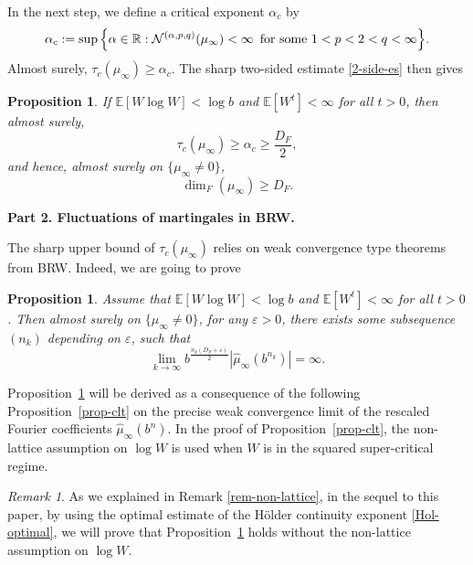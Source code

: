 \documentclass[12pt]{amsart}
\newtheorem{proposition}[theorem]{Proposition}
\theoremstyle{definition}
\theoremstyle{remark}
\newtheorem*{remark*}{Remark}
\newcommand{\R}{\mathbb{R}}
\newcommand{\E}{\mathbb{E}}
\numberwithin{equation}{section}
\begin{document}
In the next step, we define a critical exponent $\alpha_c$ by 
\begin{align}\label{def-a-c}
\alpha_c: =  \sup \Big\{\alpha \in \R:  \mathcal{N}^{(\alpha, p, q)}(\mu_\infty) <\infty \text{\, for some $1<p<2<q<\infty$} \Big\}. 
\end{align}
Almost surely, $\tau_c(\mu_\infty) \ge \alpha_c$. The sharp two-sided estimate \eqref{2-side-es} then  gives

\begin{proposition}\label{prop-a-c}
If $\E[W\log W]<\log b$ and $\E[W^t]<\infty$ for all $t>0$,   then  almost surely, 
\[
\tau_c(\mu_\infty) \ge \alpha_c \ge \frac{D_F}{2}, 
\]
and hence, almost surely on $\{\mu_\infty \ne 0\}$, 
\[
\dim_F(\mu_\infty) \ge D_F.
\]
\end{proposition}


{\flushleft \bf  Part 2. Fluctuations of martingales in BRW.} 


The sharp upper bound of $\tau_c(\mu_\infty)$ relies on weak convergence type theorems from BRW. Indeed, we  are going to prove

\begin{proposition}\label{prop-to-infty}
Assume that $\E[W\log W]<\log b$ and $\E[W^t]<\infty$ for all $t>0$.   Then  almost surely on $\{\mu_\infty\ne 0\}$,   for any $\varepsilon>0$, there exists some subsequence $(n_k)$  depending on $\varepsilon$,  such that 
\[
\lim_{k\to\infty} b^{\frac{n_k (D_F+\varepsilon)}{2}} |\widehat{\mu}_\infty(b^{n_k})| =  \infty. 
\]
\end{proposition}


 Proposition~\ref{prop-to-infty} will be derived as a consequence of  the following Proposition~\ref{prop-clt} on the precise weak convergence limit of the rescaled  Fourier coefficients $\widehat{\mu}_\infty(b^n)$.     In the proof of  Proposition~\ref{prop-clt}, the non-lattice assumption on $\log W$  is used when $W$ is in the squared super-critical regime. 
 
 \begin{remark*}
As we explained in Remark \ref{rem-non-lattice},  in the sequel to this paper,  by using the optimal estimate of the H\"older continuity exponent \eqref{Hol-optimal}, we will prove that Proposition~\ref{prop-to-infty} holds   without the non-lattice assumption on $\log W$. 
 \end{remark*}
 
\end{document}

